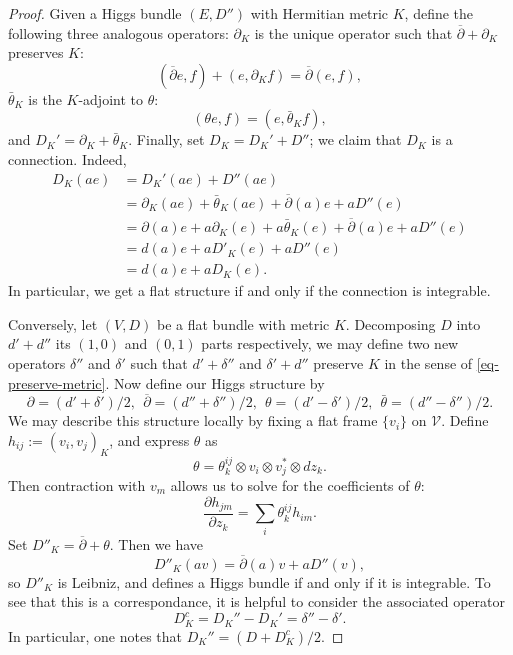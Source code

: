 \documentclass[letterpaper, 12pt]{article}
\theoremstyle{definition}
\newcommand{\del}{\partial}
\newcommand{\delbar}{\overline{\del}}
\begin{document}
\begin{proof}
    Given a Higgs bundle $(E, D'')$ with Hermitian metric $K$, define the following three analogous operators: \( \del_K\) is the unique operator such that $\delbar + \del_K$ preserves $K$:
\begin{equation} \label{eq-preserve-metric}
    (\delbar e, f) + (e, \del_K f) = \delbar(e, f),
\end{equation}
 $\bar\theta_K$ is the $K$-adjoint to $\theta$:
 \begin{equation}
     (\theta e, f) = (e, \bar\theta_K f),
 \end{equation}
 and \(D_K' = \del_K + \bar\theta_K\). Finally, set \(D_K = D_K' + D''\); we claim that $D_K$ is a connection. Indeed,
 \begin{align*}
     D_K(ae) &= D_K'(ae) + D''(ae) \\
     &= \del_K(ae) + \bar\theta_K(ae) + \delbar(a)e + aD''(e) \\
     &= \del(a)e + a\del_K(e) + a\bar\theta_K(e) + \delbar(a)e + aD''(e) \\
     &= d(a)e + aD'_K(e) + aD''(e) \\
     &= d(a)e + aD_K(e).
 \end{align*}
In particular, we get a flat structure if and only if the connection is integrable.

Conversely, let $(V, D)$ be a flat bundle with metric $K$. Decomposing $D$ into $d' + d''$ its $(1,0)$ and $(0,1)$ parts respectively, we may define two new operators $\delta''$ and $\delta'$ such that $d' + \delta''$ and $\delta' + d''$ preserve $K$ in the sense of \eqref{eq-preserve-metric}. Now define our Higgs structure by
\begin{equation}
    \del = (d' + \delta') / 2,\ \ \delbar = (d'' + \delta'') / 2,\ \ 
    \theta = (d' - \delta') / 2,\ \ \bar\theta = (d'' - \delta'') / 2.
\end{equation}
We may describe this structure locally by fixing a flat frame $\{v_i\}$ on $\mathcal{V}$. Define $h_{ij} := (v_i, v_j)_K$, and express $\theta$ as
\begin{equation}
    \theta = \theta^{ij}_k \otimes v_i \otimes v_j^* \otimes dz_k.
\end{equation}
Then contraction with $v_m$ allows us to solve for the coefficients of $\theta$:
\begin{equation}
    \frac{\del h_{jm}}{\del z_k} = \sum_i \theta^{ij}_k h_{im}.
\end{equation}
Set $D''_K = \delbar + \theta$. Then we have
\begin{equation}
    D''_K(av) = \delbar(a)v + aD''(v),
\end{equation}
so $D''_K$ is Leibniz, and defines a Higgs bundle if and only if it is integrable. To see that this is a correspondance, it is helpful to consider the associated operator
\begin{equation}
    D_K^c = D_K'' - D_K' = \delta'' - \delta'.
\end{equation}
In particular, one notes that $D_K'' = (D + D_K^c) / 2$.
\end{proof}
\end{document}
